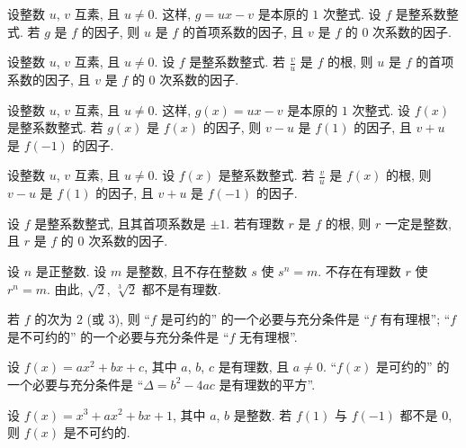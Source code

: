 \begin{proposition}
    设整数 $u$, $v$ 互素, 且 $u \neq 0$. 这样, $g = ux - v$ 是本原的 $1$ 次整式. 设 $f$ 是整系数整式. 若 $g$ 是 $f$ 的因子, 则 $u$ 是 $f$ 的首项系数的因子, 且 $v$ 是 $f$ 的 $0$ 次系数的因子.
\end{proposition}

\begin{proposition}
    设整数 $u$, $v$ 互素, 且 $u \neq 0$. 设 $f$ 是整系数整式. 若 $\frac{v}{u}$ 是 $f$ 的根, 则 $u$ 是 $f$ 的首项系数的因子, 且 $v$ 是 $f$ 的 $0$ 次系数的因子.
\end{proposition}

\begin{proposition}
    设整数 $u$, $v$ 互素, 且 $u \neq 0$. 这样, $g(x) = ux - v$ 是本原的 $1$ 次整式. 设 $f(x)$ 是整系数整式. 若 $g(x)$ 是 $f(x)$ 的因子, 则 $v - u$ 是 $f(1)$ 的因子, 且 $v + u$ 是 $f(-1)$ 的因子.
\end{proposition}

\begin{proposition}
    设整数 $u$, $v$ 互素, 且 $u \neq 0$. 设 $f(x)$ 是整系数整式. 若 $\frac{v}{u}$ 是 $f(x)$ 的根, 则 $v - u$ 是 $f(1)$ 的因子, 且 $v + u$ 是 $f(-1)$ 的因子.
\end{proposition}

\begin{proposition}
    设 $f$ 是整系数整式, 且其首项系数是 $\pm 1$. 若有理数 $r$ 是 $f$ 的根, 则 $r$ 一定是整数, 且 $r$ 是 $f$ 的 $0$ 次系数的因子.
\end{proposition}

\begin{proposition}
    设 $n$ 是正整数. 设 $m$ 是整数, 且不存在整数 $s$ 使 $s^n = m$. 不存在有理数 $r$ 使 $r^n = m$. 由此, $\sqrt{2}$, $\sqrt[3]{2}$ 都不是有理数.
\end{proposition}

\begin{proposition}
    若 $f$ 的次为 $2$ (或 $3$), 则 ``$f$ 是可约的'' 的一个必要与充分条件是 ``$f$ 有有理根''; ``$f$ 是不可约的'' 的一个必要与充分条件是 ``$f$ 无有理根''.
\end{proposition}

\begin{proposition}
    设 $f(x) = ax^2 + bx + c$, 其中 $a$, $b$, $c$ 是有理数, 且 $a \neq 0$. ``$f(x)$ 是可约的'' 的一个必要与充分条件是 ``$\Delta = b^2 - 4ac$ 是有理数的平方''.
\end{proposition}

\begin{proposition}
    设 $f(x) = x^3 + ax^2 + bx + 1$, 其中 $a$, $b$ 是整数. 若 $f(1)$ 与 $f(-1)$ 都不是 $0$, 则 $f(x)$ 是不可约的.
\end{proposition}


